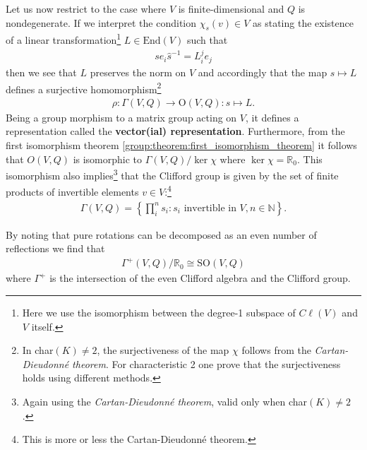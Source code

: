     \begin{property}
        Let us now restrict to the case where $V$ is finite-dimensional and $Q$ is nondegenerate. If we interpret the condition $\chi_s(v)\in V$ as stating the existence of a linear transformation\footnote{Here we use the isomorphism between the degree-1 subspace of $C\ell(V)$ and $V$ itself.} $L\in\text{End}(V)$ such that
        \begin{gather}
            se_i\hat{s}^{-1} = L^j_ie_j
        \end{gather}
        then we see that $L$ preserves the norm on $V$ and accordingly that the map $s\mapsto L$ defines a surjective homomorphism\footnote{In char$(K)\neq2$, the surjectiveness of the map $\chi$ follows from the \textit{Cartan-Dieudonn\'e theorem}. For characteristic 2 one prove that the surjectiveness holds using different methods.}
        \begin{gather}
            \rho:\Gamma(V, Q)\rightarrow\text{O}(V, Q): s\mapsto L.
        \end{gather}
        Being a group morphism to a matrix group acting on $V$, it defines a representation called the \textbf{vector(ial) representation}. Furthermore, from the first isomorphism theorem \ref{group:theorem:first_isomorphism_theorem} it follows that $O(V, Q)$ is isomorphic to $\Gamma(V, Q)/\ker\chi$ where $\ker\chi = \mathbb{R}_0$. This isomorphism also implies\footnote{Again using the \textit{Cartan-Dieudonn\'e theorem}, valid only when char$(K)\neq2$.} that the Clifford group is given by the set of finite products of invertible elements $v\in V$:\footnote{This is more or less the Cartan-Dieudonn\'e theorem.}
        \begin{gather}
            \Gamma(V, Q) = \left\{\prod_i^n s_i : s_i\text{ invertible in }V, n\in\mathbb{N}\right\}.
        \end{gather}
    \end{property}
    \begin{result}
        By noting that pure rotations can be decomposed as an even number of reflections we find that
        \begin{gather}
            \Gamma^+(V, Q)/\mathbb{R}_0\cong\text{SO}(V, Q)
        \end{gather}
        where $\Gamma^+$ is the intersection of the even Clifford algebra and the Clifford group.
    \end{result}


